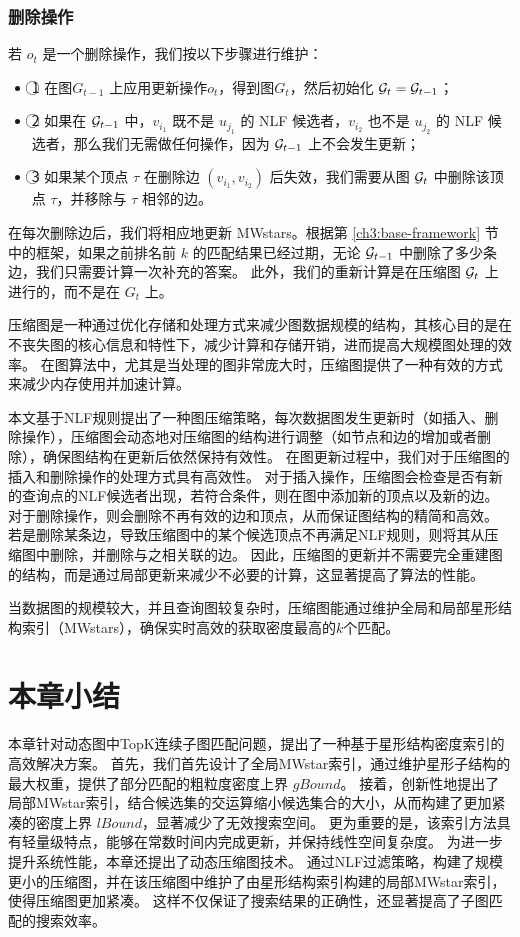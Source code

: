 \subsubsection{删除操作}
若 $o_t$ 是一个删除操作，我们按以下步骤进行维护：
\begin{itemize}
\item \textcircled{1} 在图$G_{t-1}$ 上应用更新操作$o_t$，得到图$G_t$，然后初始化 $\mathcal{G}_t = \mathcal{G}_{t-1}$；
\item \textcircled{2} 如果在 $\mathcal{G}_{t-1}$ 中，$v_{i_1}$ 既不是 $u_{j_1}$ 的 NLF 候选者，$v_{i_2}$ 也不是 $u_{j_2}$ 的 NLF 候选者，那么我们无需做任何操作，因为 $\mathcal{G}_{t-1}$ 上不会发生更新；
\item \textcircled{3} 如果某个顶点 $\tau$ 在删除边 $(v_{i_1}, v_{i_2})$ 后失效，我们需要从图 $\mathcal{G}_t$ 中删除该顶点 $\tau$，并移除与 $\tau$ 相邻的边。
\end{itemize}

在每次删除边后，我们将相应地更新 MWstars。根据第 \ref{ch3:base-framework} 节中的框架，如果之前排名前 $k$ 的匹配结果已经过期，无论 $\mathcal{G}_{t-1}$ 中删除了多少条边，我们只需要计算一次补充的答案。
此外，我们的重新计算是在压缩图 $\mathcal{G}_t$ 上进行的，而不是在 $G_t$ 上。

压缩图是一种通过优化存储和处理方式来减少图数据规模的结构，其核心目的是在不丧失图的核心信息和特性下，减少计算和存储开销，进而提高大规模图处理的效率。
在图算法中，尤其是当处理的图非常庞大时，压缩图提供了一种有效的方式来减少内存使用并加速计算。

本文基于NLF规则提出了一种图压缩策略，每次数据图发生更新时（如插入、删除操作），压缩图会动态地对压缩图的结构进行调整（如节点和边的增加或者删除），确保图结构在更新后依然保持有效性。
在图更新过程中，我们对于压缩图的插入和删除操作的处理方式具有高效性。
对于插入操作，压缩图会检查是否有新的查询点的NLF候选者出现，若符合条件，则在图中添加新的顶点以及新的边。
对于删除操作，则会删除不再有效的边和顶点，从而保证图结构的精简和高效。
若是删除某条边，导致压缩图中的某个候选顶点不再满足NLF规则，则将其从压缩图中删除，并删除与之相关联的边。
因此，压缩图的更新并不需要完全重建图的结构，而是通过局部更新来减少不必要的计算，这显著提高了算法的性能。

当数据图的规模较大，并且查询图较复杂时，压缩图能通过维护全局和局部星形结构索引（MWstars），确保实时高效的获取密度最高的$k$个匹配。

\section{本章小结}
本章针对动态图中TopK连续子图匹配问题，提出了一种基于星形结构密度索引的高效解决方案。
首先，我们首先设计了全局MWstar索引，通过维护星形子结构的最大权重，提供了部分匹配的粗粒度密度上界 $gBound$。
接着，创新性地提出了局部MWstar索引，结合候选集的交运算缩小候选集合的大小，从而构建了更加紧凑的密度上界 $lBound$，显著减少了无效搜索空间。
更为重要的是，该索引方法具有轻量级特点，能够在常数时间内完成更新，并保持线性空间复杂度。
为进一步提升系统性能，本章还提出了动态压缩图技术。
通过NLF过滤策略，构建了规模更小的压缩图，并在该压缩图中维护了由星形结构索引构建的局部MWstar索引，使得压缩图更加紧凑。
这样不仅保证了搜索结果的正确性，还显著提高了子图匹配的搜索效率。

